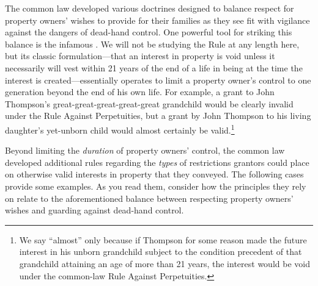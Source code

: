The common law developed various doctrines designed to balance respect for
property owners' wishes to provide for their families as they see fit with
vigilance against the dangers of dead-hand control. One powerful tool for
striking this balance is the infamous .
We will not be
studying the Rule at any length here, but its classic formulation---that an
interest in property is void unless it necessarily will vest within 21 years of
the end of a life in being at the time the interest is created---essentially
operates to limit a property owner's control to one generation beyond the end
of his own life. For example, a grant to John Thompson's
great-great-great-great-great grandchild would be clearly invalid under the
Rule Against Perpetuities, but a grant by John Thompson to his living
daughter's yet-unborn child would almost certainly be valid.\footnote{We say
``almost'' only because if Thompson for some reason made the future interest in
his unborn grandchild subject to the condition precedent of that grandchild
attaining an age of more than 21 years, the interest would be void under the
common-law Rule Against Perpetuities.}

Beyond limiting the \textit{duration} of property owners' control, the common
law developed additional rules regarding the \textit{types} of restrictions
grantors could place on otherwise valid interests in property that they
conveyed. The following cases provide some examples. As you read them, consider
how the principles they rely on relate to the aforementioned balance between
respecting property owners' wishes and guarding against dead-hand control.

